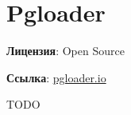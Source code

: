 \section{Pgloader}
\textbf{Лицензия}: Open Source

\textbf{Ссылка}: \href{http://pgloader.io/}{pgloader.io}

TODO